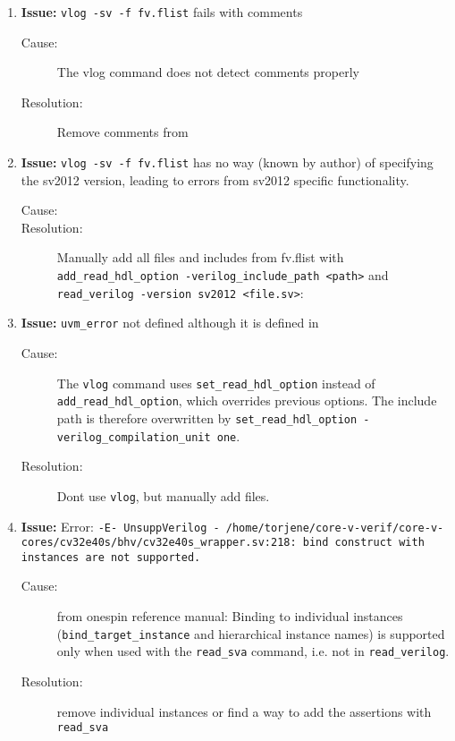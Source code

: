 \begin{enumerate}


\item \textbf{Issue:} \lstinline{vlog -sv -f fv.flist} fails with comments
  \begin{description}
    \item[Cause:] The vlog command does not detect comments properly
    \item[Resolution:] Remove comments from 
  \end{description}

\item \textbf{Issue:} \lstinline{vlog -sv -f fv.flist} has no way (known by author) of specifying the sv2012 version, leading to errors from sv2012 specific functionality.
  \begin{description}
    \item[Cause:] 
    \item[Resolution:] Manually add all files and includes from fv.flist with \lstinline{add_read_hdl_option -verilog_include_path <path>} and \lstinline{read_verilog -version sv2012 <file.sv>}:
  \end{description}

\item \textbf{Issue:}  \lstinline{uvm_error} not defined although it is defined in 
  \begin{description}
    \item[Cause:] The \lstinline{vlog} command uses \lstinline{set_read_hdl_option} instead of  \lstinline{add_read_hdl_option}, which overrides previous options. The include path is therefore overwritten by \lstinline{set_read_hdl_option -verilog_compilation_unit one}.
    \item[Resolution:] Dont use \lstinline{vlog}, but manually add files.
  \end{description}
  
 \item \textbf{Issue:} Error: \lstinline{-E- UnsuppVerilog - /home/torjene/core-v-verif/core-v-cores/cv32e40s/bhv/cv32e40s_wrapper.sv:218: bind construct with instances are not supported.}
  \begin{description}
    \item[Cause:] from onespin reference manual: Binding to individual instances (\lstinline{bind_target_instance} and hierarchical instance names) is supported only when used with the \lstinline{read_sva} command, i.e. not in \lstinline{read_verilog}.
    \item[Resolution:] remove individual instances or find a way to add the assertions with \lstinline{read_sva}
  \end{description}
  

\end{enumerate}
